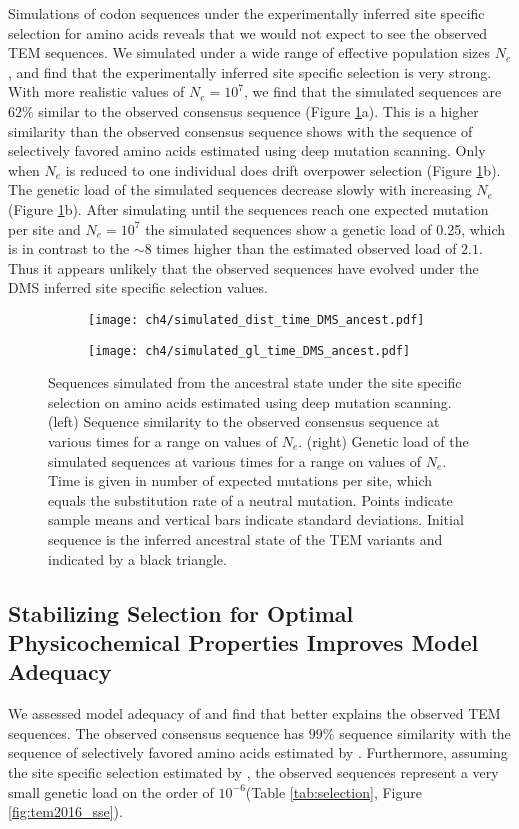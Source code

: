Simulations of codon sequences under the experimentally inferred site specific selection for amino acids reveals that we would not expect to see the observed TEM sequences.
We simulated under a wide range of effective population sizes $N_e$, and find that the experimentally inferred site specific selection is very strong.
With more realistic values of $N_e = 10^7$, we find that the simulated sequences are $62 \%$ similar to the observed consensus sequence (Figure \ref{fig:dms_sim}a).
This is a higher similarity than the observed consensus sequence shows with the sequence of selectively favored amino acids estimated using deep mutation scanning.
Only when $N_e$ is reduced to one individual does drift overpower selection (Figure \ref{fig:dms_sim}b).
The genetic load of the simulated sequences decrease slowly with increasing $N_e$ (Figure \ref{fig:dms_sim}b).
After simulating until the sequences reach one expected mutation per site and $N_e = 10^7$ the simulated sequences show a genetic load of 0.25, which is in contrast to the $\sim 8$ times higher than the estimated observed load of $2.1$.
Thus it appears unlikely that the observed sequences have evolved under the DMS inferred site specific selection values.


\begin{figure}[h]
    \centering
    \begin{subfigure}
        \centering
        \texttt{[image: ch4/simulated\_dist\_time\_DMS\_ancest.pdf]}
    \end{subfigure}
    \begin{subfigure}
        \centering
        \texttt{[image: ch4/simulated\_gl\_time\_DMS\_ancest.pdf]}
    \end{subfigure}
    \caption{Sequences simulated from the ancestral state under the site specific selection on amino acids estimated using deep mutation scanning. 
    (left) Sequence similarity to the observed consensus sequence at various times for a range on values of $N_e$.
    (right) Genetic load of the simulated sequences at various times for a range on values of $N_e$.
    Time is given in number of expected mutations per site, which equals the substitution rate of a neutral mutation.
    Points indicate sample means and vertical bars indicate standard deviations. Initial sequence is the inferred ancestral state of the TEM variants and indicated by a black triangle.}
    \label{fig:dms_sim}
\end{figure}

\subsection{Stabilizing Selection for Optimal Physicochemical Properties Improves Model Adequacy} 
We assessed model adequacy of \selac and find that \selac better explains the observed TEM sequences.
The observed consensus sequence has $99 \%$ sequence similarity with the sequence of selectively favored amino acids estimated by \selac.
Furthermore, assuming the site specific selection estimated by \selac, the observed sequences represent a very small genetic load on the order of $10^{-6}$(Table \ref{tab:selection}, Figure \ref{fig:tem2016_sse}).

